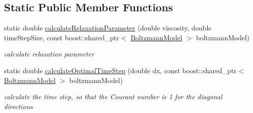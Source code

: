 \subsection*{Static Public Member Functions}
\begin{DoxyCompactItemize}
\item 
\hypertarget{classnatrium_1_1CollisionModel_a62aa0017c633a5716b1a6b31ec31aa52}{static double \hyperlink{classnatrium_1_1CollisionModel_a62aa0017c633a5716b1a6b31ec31aa52}{calculate\-Relaxation\-Parameter} (double viscosity, double time\-Step\-Size, const boost\-::shared\-\_\-ptr$<$ \hyperlink{classnatrium_1_1BoltzmannModel}{Boltzmann\-Model} $>$ boltzmann\-Model)}\label{classnatrium_1_1CollisionModel_a62aa0017c633a5716b1a6b31ec31aa52}

\begin{DoxyCompactList}\small\item\em calculate relaxation parameter \end{DoxyCompactList}\item 
\hypertarget{classnatrium_1_1CollisionModel_abb8f6d14ca6994afd4c720e42f778df5}{static double \hyperlink{classnatrium_1_1CollisionModel_abb8f6d14ca6994afd4c720e42f778df5}{calculate\-Optimal\-Time\-Step} (double dx, const boost\-::shared\-\_\-ptr$<$ \hyperlink{classnatrium_1_1BoltzmannModel}{Boltzmann\-Model} $>$ boltzmann\-Model)}\label{classnatrium_1_1CollisionModel_abb8f6d14ca6994afd4c720e42f778df5}

\begin{DoxyCompactList}\small\item\em calculate the time step, so that the Courant number is 1 for the diagonal directions \end{DoxyCompactList}\end{DoxyCompactItemize}
